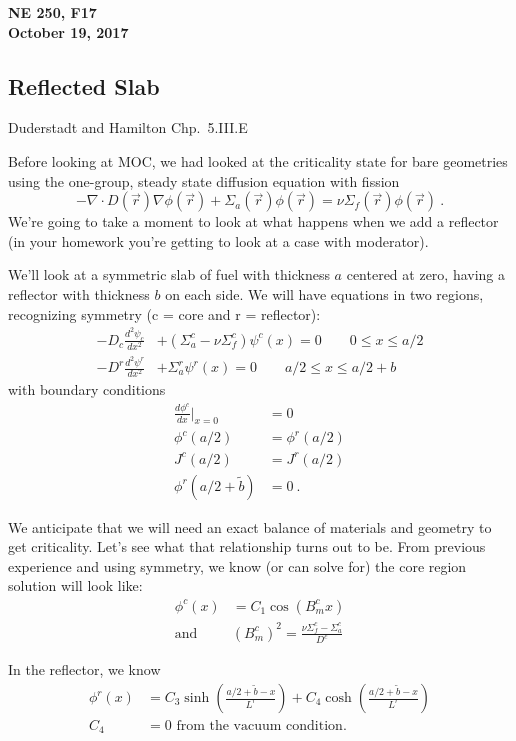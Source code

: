 \documentclass[12pt]{article}
\begin{document}
\begin{center}
{\bf NE 250, F17\\
October 19, 2017 
}
\end{center}


\subsection*{Reflected Slab}
Duderstadt and Hamilton Chp.\ 5.III.E 

Before looking at MOC, we had looked at the criticality state for bare geometries using the one-group, steady state diffusion equation with fission
\begin{equation}
 - \nabla \cdot D(\vec{r}) \nabla	\phi(\vec{r}) + \Sigma_a(\vec{r}) \phi(\vec{r}) = \nu\Sigma_f (\vec{r})\phi(\vec{r})\:.
\end{equation}
% 
We're going to take a moment to look at what happens when we add a reflector (in your homework you're getting to look at a case with moderator). 

We'll look at a symmetric slab of fuel with thickness $a$ centered at zero, having a reflector with thickness $b$ on each side. We will have equations in two regions, recognizing symmetry (c = core and r = reflector):
\begin{align*}
-D_c\frac{d^2 \psi_c}{dx^2} &+ (\Sigma_a^c - \nu \Sigma_f^c) \psi^c(x) = 0  \qquad 0 \leq x \leq a/2\\
-D^r\frac{d^2 \psi^r}{dx^2} &+ \Sigma_a^r \psi^r(x) = 0  \qquad a/2 \leq x \leq a/2+b
\end{align*}
with boundary conditions
\begin{align*}
\frac{d \phi^c}{dx}|_{x=0} &= 0 \\
\phi^c(a/2) &= \phi^r(a/2)\\
J^c(a/2) &= J^r(a/2)\\
\phi^r(a/2+\tilde{b}) &= 0\:.
\end{align*}

We anticipate that we will need an exact balance of materials and geometry to get criticality. Let's see what that relationship turns out to be. 
From previous experience and using symmetry, we know (or can solve for) the core region solution will look like:
\begin{align*}
\phi^c(x) &= C_1 \cos(B_m^c x)\\
\text{and }&(B_m^c)^2 = \frac{\nu \Sigma_f^c - \Sigma_a^c}{D^c}
\end{align*}

In the reflector, we know 
\begin{align*}
\phi^r(x) &= C_3 \sinh(\frac{a/2+\tilde{b} - x}{L^r}) + C_4 \cosh(\frac{a/2+\tilde{b} - x}{L^r}) \\
C_4 &= 0 \text{ from the vacuum condition.}
\end{align*}
\end{document}
